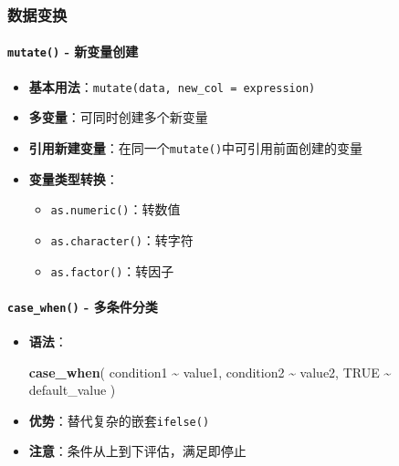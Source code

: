 \documentclass[
]{book}
\newenvironment{Shaded}{\begin{snugshade}}{\end{snugshade}}
\newcommand{\ConstantTok}[1]{\textcolor[rgb]{0.56,0.35,0.01}{#1}}
\newcommand{\FunctionTok}[1]{\textcolor[rgb]{0.13,0.29,0.53}{\textbf{#1}}}
\newcommand{\NormalTok}[1]{#1}
\newcommand{\SpecialCharTok}[1]{\textcolor[rgb]{0.81,0.36,0.00}{\textbf{#1}}}
\providecommand{\tightlist}{%
  \setlength{\itemsep}{0pt}\setlength{\parskip}{0pt}}
\begin{document}
\hypertarget{ux6570ux636eux53d8ux6362}{%
\subsubsection{数据变换}\label{ux6570ux636eux53d8ux6362}}

\hypertarget{mutate---ux65b0ux53d8ux91cfux521bux5efa}{%
\paragraph{\texorpdfstring{\texttt{mutate()} - 新变量创建}{mutate() - 新变量创建}}\label{mutate---ux65b0ux53d8ux91cfux521bux5efa}}

\begin{itemize}
\tightlist
\item
  \textbf{基本用法}：\texttt{mutate(data,\ new\_col\ =\ expression)}
\item
  \textbf{多变量}：可同时创建多个新变量
\item
  \textbf{引用新建变量}：在同一个\texttt{mutate()}中可引用前面创建的变量
\item
  \textbf{变量类型转换}：

  \begin{itemize}
  \tightlist
  \item
    \texttt{as.numeric()}：转数值
  \item
    \texttt{as.character()}：转字符
  \item
    \texttt{as.factor()}：转因子
  \end{itemize}
\end{itemize}

\hypertarget{case_when---ux591aux6761ux4ef6ux5206ux7c7b}{%
\paragraph{\texorpdfstring{\texttt{case\_when()} - 多条件分类}{case\_when() - 多条件分类}}\label{case_when---ux591aux6761ux4ef6ux5206ux7c7b}}

\begin{itemize}
\item
  \textbf{语法}：

\begin{Shaded}
\begin{Highlighting}[]
\FunctionTok{case\_when}\NormalTok{(}
\NormalTok{  condition1 }\SpecialCharTok{\textasciitilde{}}\NormalTok{ value1,}
\NormalTok{  condition2 }\SpecialCharTok{\textasciitilde{}}\NormalTok{ value2,}
  \ConstantTok{TRUE} \SpecialCharTok{\textasciitilde{}}\NormalTok{ default\_value}
\NormalTok{)}
\end{Highlighting}
\end{Shaded}
\item
  \textbf{优势}：替代复杂的嵌套\texttt{ifelse()}
\item
  \textbf{注意}：条件从上到下评估，满足即停止
\end{itemize}
\end{document}
